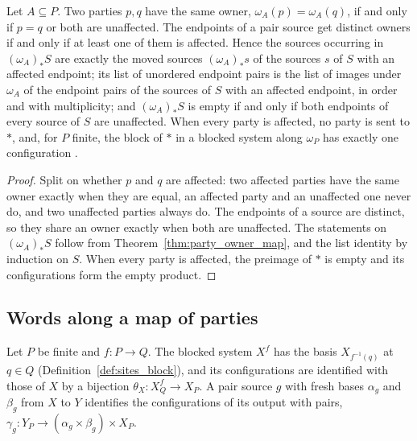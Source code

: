 \begin{theorem}
    \label{thm:party_affected_owner}
    \leanok
    Let $A\subseteq P$. Two parties $p,q$ have the same owner, $\omega_A(p)=\omega_A(q)$,
    if and only if $p=q$ or both are unaffected. The endpoints of a pair source get
    distinct owners if and only if at least one of them is affected. Hence the
    sources occurring in $(\omega_A)_*S$ are exactly the moved sources $(\omega_A)_*s$
    of the sources $s$ of $S$ with an affected endpoint; its list of unordered
    endpoint pairs is the list of images under $\omega_A$ of the endpoint pairs of
    the sources of $S$ with an affected endpoint, in order and with multiplicity; and
    $(\omega_A)_*S$ is empty if and only if both endpoints of every source of $S$
    are unaffected. When every party is affected, no party is sent to $\ast$, and, for
    $P$ finite, the block of $\ast$ in a blocked system along $\omega_P$ has exactly
    one configuration \cite[Theorem~5.2]{OpenAI2026PolynomialPEPS}.
\end{theorem}
\begin{proof}\leanok
    Split on whether $p$ and $q$ are affected: two affected parties have the same
    owner exactly when they are equal, an affected party and an unaffected one never
    do, and two unaffected parties always do. The endpoints of a source are distinct,
    so they share an owner exactly when both are unaffected. The statements on
    $(\omega_A)_*S$ follow from Theorem~\ref{thm:party_owner_map}, and the list
    identity by induction on $S$. When every party is affected, the preimage of
    $\ast$ is empty and its configurations form the empty product.
\end{proof}

\subsection{Words along a map of parties}
\label{sec:party_coarsen}

Let $P$ be finite and $f\colon P\to Q$. The blocked system $X^f$ has the basis
$X_{f^{-1}(q)}$ at $q\in Q$ (Definition~\ref{def:sites_block}), and its
configurations are identified with those of $X$ by a bijection
$\theta_X\colon X^f_Q\to X_P$. A pair source $g$ with fresh bases $\alpha_g$ and
$\beta_g$ from $X$ to $Y$ identifies the configurations of its output with pairs,
$\gamma_g\colon Y_P\to(\alpha_g\times\beta_g)\times X_P$.

